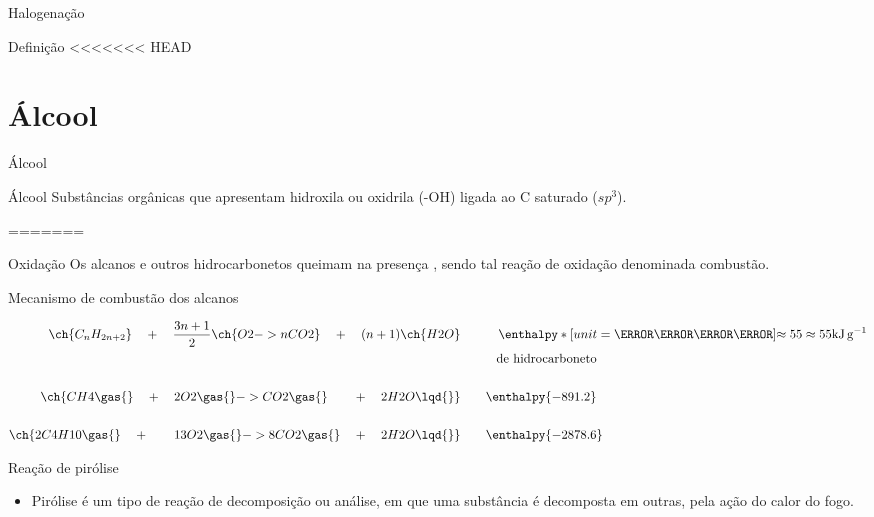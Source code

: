 \documentclass[presentation,professionalfonts,aspectratio=169]{beamer}
\begin{document}
\begin{frame}[label={sec:orgc1e6b56}]{Halogenação}
\begin{frame}[label={sec:orgc944da7}]{Definição}
<<<<<<< HEAD

\section{Álcool}
\label{sec:org49376fa}
\begin{frame}[label={sec:orge7bff21}]{Álcool}
\begin{mybox}{Álcool}
Substâncias  orgânicas  que  apresentam  hidroxila  ou oxidrila (-OH) ligada ao C saturado (\(sp^3\)).


  \begin{center}
=======
\begin{frame}[label={sec:orgd298ae7}]{Oxidação}
Os \alert{alcanos} e outros \alert{hidrocarbonetos} queimam na presença , sendo tal reação de oxidação denominada
\alert{combustão}.


\begin{bclogo}[couleur=blue!30 , arrondi=0.1 , logo=\bcplume , epBarre=3.5]{Mecanismo de combustão dos alcanos}


\begin{align*}
\ch{C_nH_{2n+2}} \quad + \quad  \frac{3n+1}{2}\ch{O2 -> n CO2}\quad +\quad (n+1)\ch{H2O} & \qquad \quad \enthalpy*[unit=\kilo\joule\per\gram]{\approx 55} \approx 55 \unit{\kilo\joule\per\gram}\\ & \hspace{1cm} \mathrm{de~hidrocarboneto} \\ \\
\ch{CH4\gas{} \quad{} + \quad{} 2 O2\gas{} -> CO2\gas{} \qquad{} + \quad{} 2 H2O\lqd{}} & \quad \quad \enthalpy{-891.2}\\ \\
	\ch{2 C4H10\gas{} \quad{} + \qquad{} 13 O2\gas{} -> 8 CO2\gas{} \quad{} + \quad{} 2 H2O\lqd{}} & \quad \quad \enthalpy{-2878.6}    
\end{align*}
\end{bclogo}
\end{frame}


\begin{frame}[label={sec:orgc063fc6}]{Reação de pirólise}
\begin{itemize}
\item \alert{Pirólise} é um tipo de reação de decomposição ou análise, em que uma substância é decomposta em outras, pela ação do calor do fogo.
\end{itemize}




\end{frame}
\end{center}
\end{mybox}
\end{frame}
\end{frame}
\end{frame}
\end{document}
